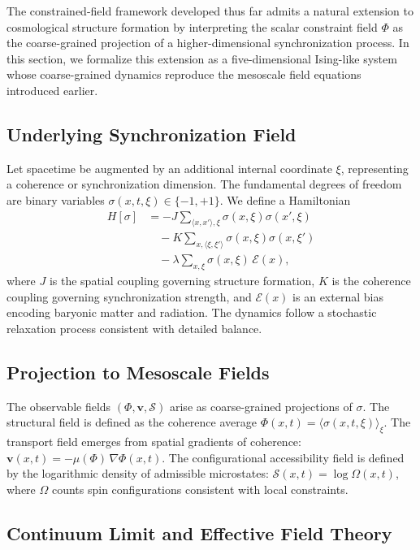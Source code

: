 \documentclass[11pt, a4paper, twocolumn]{article}
\newcommand{\Sfield}{\mathcal{S}}
\begin{document}
The constrained-field framework developed thus far admits a natural extension
to cosmological structure formation by interpreting the scalar constraint field
$\Phi$ as the coarse-grained projection of a higher-dimensional synchronization
process. In this section, we formalize this extension as a five-dimensional
Ising-like system whose coarse-grained dynamics reproduce the mesoscale field
equations introduced earlier.

\subsection{Underlying Synchronization Field}

Let spacetime be augmented by an additional internal coordinate $\xi$,
representing a coherence or synchronization dimension. The fundamental degrees
of freedom are binary variables $\sigma(x,t,\xi) \in \{-1,+1\}$. We define a
Hamiltonian
\begin{align*}
H[\sigma]
&= - J \!\sum_{\langle x,x' \rangle,\xi}\! \sigma(x,\xi)\sigma(x',\xi)\\
&\quad - K \!\sum_{x,\langle \xi,\xi' \rangle}\! \sigma(x,\xi)\sigma(x,\xi')\\
&\quad - \lambda \!\sum_{x,\xi} \sigma(x,\xi)\,\mathcal{E}(x),
\end{align*}
where $J$ is the spatial coupling governing structure formation, $K$ is the
coherence coupling governing synchronization strength, and $\mathcal{E}(x)$
is an external bias encoding baryonic matter and radiation. The dynamics follow
a stochastic relaxation process consistent with detailed balance.

\subsection{Projection to Mesoscale Fields}

The observable fields $(\Phi,\mathbf{v},\Sfield)$ arise as coarse-grained
projections of $\sigma$. The structural field is defined as the coherence
average $\Phi(x,t) = \langle \sigma(x,t,\xi) \rangle_\xi$. The transport field
emerges from spatial gradients of coherence: $\mathbf{v}(x,t) = -\mu(\Phi)\,
\nabla\Phi(x,t)$. The configurational accessibility field is defined by the
logarithmic density of admissible microstates: $\Sfield(x,t) = \log\Omega(x,t)$,
where $\Omega$ counts spin configurations consistent with local constraints.

\subsection{Continuum Limit and Effective Field Theory}
\end{document}
